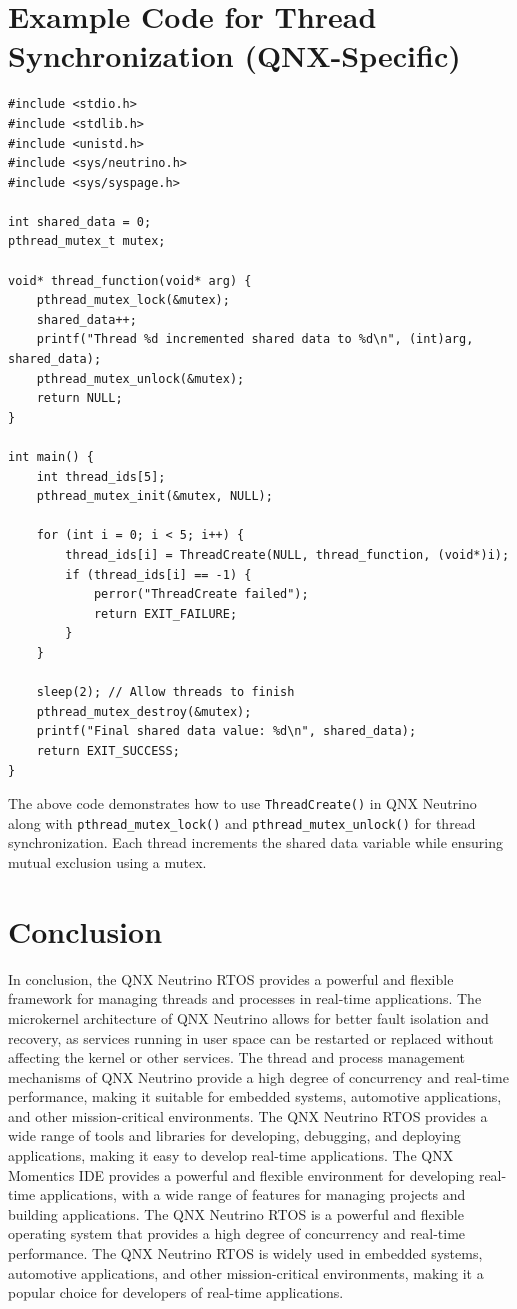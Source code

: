 \documentclass{article}
\begin{document}
\section{Example Code for Thread Synchronization (QNX-Specific)}
\label{sec:example-code-threadcreate-synchronization}
\begin{verbatim}
#include <stdio.h>
#include <stdlib.h>
#include <unistd.h>
#include <sys/neutrino.h>
#include <sys/syspage.h>

int shared_data = 0;
pthread_mutex_t mutex;

void* thread_function(void* arg) {
    pthread_mutex_lock(&mutex);
    shared_data++;
    printf("Thread %d incremented shared data to %d\n", (int)arg, shared_data);
    pthread_mutex_unlock(&mutex);
    return NULL;
}

int main() {
    int thread_ids[5];
    pthread_mutex_init(&mutex, NULL);

    for (int i = 0; i < 5; i++) {
        thread_ids[i] = ThreadCreate(NULL, thread_function, (void*)i);
        if (thread_ids[i] == -1) {
            perror("ThreadCreate failed");
            return EXIT_FAILURE;
        }
    }

    sleep(2); // Allow threads to finish
    pthread_mutex_destroy(&mutex);
    printf("Final shared data value: %d\n", shared_data);
    return EXIT_SUCCESS;
}
\end{verbatim}
The above code demonstrates how to use \texttt{ThreadCreate()} in QNX Neutrino along with \texttt{pthread\_mutex\_lock()} and \texttt{pthread\_mutex\_unlock()} for thread synchronization.
Each thread increments the shared data variable while ensuring mutual exclusion using a mutex.

\FloatBarrier

\section{Conclusion}
\label{sec:conclusion}
In conclusion, the QNX Neutrino RTOS provides a powerful and flexible framework for managing threads and processes in real-time applications.
The microkernel architecture of QNX Neutrino allows for better fault isolation and recovery, as services running in user space can be restarted or replaced without affecting the kernel or other services.
The thread and process management mechanisms of QNX Neutrino provide a high degree of concurrency and real-time performance, making it suitable for embedded systems, automotive applications, and other mission-critical environments.
The QNX Neutrino RTOS provides a wide range of tools and libraries for developing, debugging, and deploying applications, making it easy to develop real-time applications.
The QNX Momentics IDE provides a powerful and flexible environment for developing real-time applications, with a wide range of features for managing projects and building applications.
The QNX Neutrino RTOS is a powerful and flexible operating system that provides a high degree of concurrency and real-time performance.
The QNX Neutrino RTOS is widely used in embedded systems, automotive applications, and other mission-critical environments, making it a popular choice for developers of real-time applications.


\end{document}
